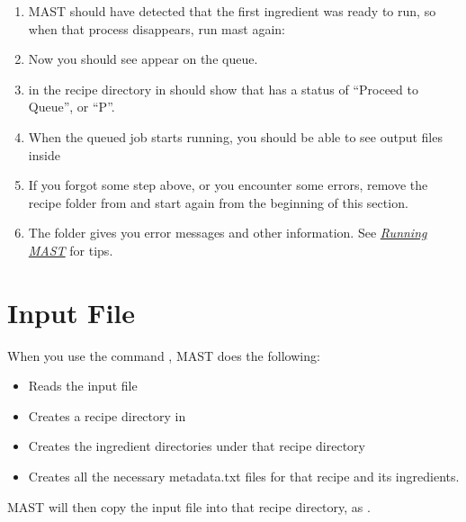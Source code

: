\documentclass[letterpaper,10pt,english]{sphinxmanual}
\begin{document}
\begin{enumerate}
\item {} 
MAST should have detected that the first ingredient was ready to run, so when that process disappears, run mast again: 

\item {} 
Now you should see  appear on the queue.

\item {} 
 in the recipe directory in  should show that  has a status of ``Proceed to Queue'', or ``P''.

\item {} 
When the queued  job starts running, you should be able to see output files inside 

\item {} 
If you forgot some step above, or you encounter some errors, remove the recipe folder from  and start again from the beginning of this section.

\item {} 
The  folder gives you error messages and other information. See {\hyperref[5_0_runningmast::doc]{\emph{Running MAST}}} for tips.

\end{enumerate}


\chapter{Input File}
\label{3_0_inputfile::doc}\label{3_0_inputfile:input-file}
When you use the command , MAST does the following:
\begin{itemize}
\item {} 
Reads the input file

\item {} 
Creates a recipe directory in 

\item {} 
Creates the ingredient directories under that recipe directory

\item {} 
Creates all the necessary metadata.txt files for that recipe and its ingredients.

\end{itemize}

MAST will then copy the input file into that recipe directory, as .
\end{document}
